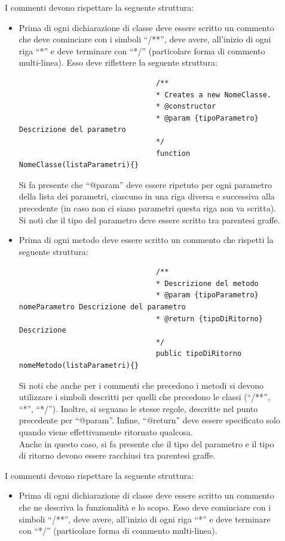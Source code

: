 			\begin{description}
					\item[] I commenti devono rispettare la seguente struttura:
						\begin{itemize}
							\item Prima di ogni dichiarazione di classe deve essere scritto un commento che deve cominciare con i simboli “/**”, deve avere, all'inizio di ogni riga “*” e deve terminare con “*/” (particolare forma di commento multi-linea). Esso deve riflettere la seguente struttura:
							\begin{lstlisting} 
								/**
								* Creates a new NomeClasse. 
								* @constructor
								* @param {tipoParametro} Descrizione del parametro 
								*/
								function NomeClasse(listaParametri){}
							\end{lstlisting}
							Si fa presente che “@param” deve essere ripetuto per ogni parametro della lista dei parametri, ciascuno in una riga diversa e successiva alla precedente (in caso non ci siano parametri questa riga non va scritta).\\
							Si noti che il tipo del parametro deve essere scritto tra parentesi graffe.
							\item Prima di ogni metodo deve essere scritto un commento che rispetti la seguente struttura:
							\begin{lstlisting} 
								/**
								* Descrizione del metodo 
								* @param {tipoParametro} nomeParametro Descrizione del parametro
								* @return {tipoDiRitorno} Descrizione 
								*/
								public tipoDiRitorno nomeMetodo(listaParametri){}
							\end{lstlisting}
							Si noti che anche per i commenti che precedono i metodi si devono utilizzare i simboli descritti per quelli che precedono le classi (“/**”, “*”, “*/”). Inoltre, si seguano le stesse regole, descritte nel punto precedente per “@param”. Infine, “@return” deve essere specificato solo quando viene effettivamente ritornato qualcosa. \\
							Anche in questo caso, si fa presente che il tipo del parametro e il tipo di ritorno devono essere racchiusi tra parentesi graffe.
						\end{itemize}
					\item[] I commenti devono rispettare la seguente struttura:
						\begin{itemize}
							\item Prima di ogni dichiarazione di classe deve essere scritto un commento che ne descriva la funzionalità e lo scopo. Esso deve cominciare con i simboli “/**”, deve avere, all'inizio di ogni riga “*” e deve terminare con “*/” (particolare forma di commento multi-linea).

\end{itemize}
\end{description}
